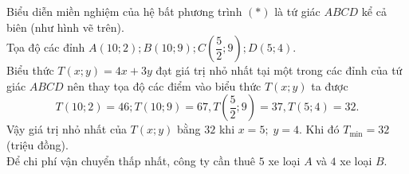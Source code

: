 \begin{ex}
{\begin{center}
		\end{center}
		Biểu diễn miền nghiệm của hệ bất phương trình $\left(*\right)$ là tứ giác $ABCD$ kể cả biên (như hình vẽ trên).\\
		Tọa độ các đỉnh $A\left(10;2\right); B\left(10;9\right); C\left(\dfrac{5}{2};9\right); D\left(5; 4\right)$.\\
		Biểu thức $T\left(x;y\right)=4x+3y$ đạt giá trị nhỏ nhất tại một trong các đỉnh của tứ giác $ABCD$ nên thay tọa độ các điểm vào biểu thức $T\left(x;y\right)$ ta được
		$$T\left(10;2\right)=46; T\left(10;9\right)=67, T\left(\dfrac{5}{2};9\right)=37, T\left(5;4\right)=32.$$
		Vậy giá trị nhỏ nhất của $T\left(x;y\right)$ bằng $32$ khi $x=5;\; y=4$. 
		Khi đó $T_{\min}=32$ (triệu đồng).\\
		Để chi phí vận chuyển thấp nhất, công ty cần thuê $5$ xe loại $A$ và $4$ xe loại $B$.\\
	} 
\end{ex}

